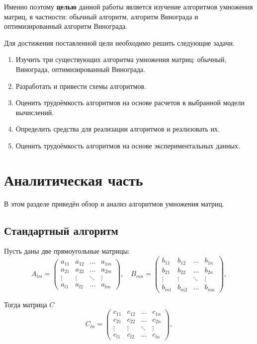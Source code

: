 \documentclass[12pt]{report}
\begin{document}
Именно поэтому \textbf{целью} данной работы является изучение алгоритмов умножения матриц, в частности: обычный алгоритм, алгоритм Винограда и оптимизированный алгоритм Винограда. 

Для достижения поставленной цели необходимо решить следующие задачи.
\begin{enumerate}
	\item Изучить три существующих алгоритма умножения матриц: обычный, Винограда, оптимизированный Винограда.
	\item Разработать и привести схемы алгоритмов.
	\item Оценить трудоёмкость алгоритмов на основе расчетов в выбранной модели вычислений.
	\item Определить средства для реализации алгоритмов и реализовать их.
	\item Оценить трудоёмкость алгоритмов на основе экспериментальных данных.
\end{enumerate}


\chapter{Аналитическая часть}

В этом разделе приведён обзор и анализ алгоритмов умножения матриц.

\section{Стандартный алгоритм}

Пусть даны две прямоугольные матрицы:
\begin{equation}
	A_{lm} = \begin{pmatrix}
		a_{11} & a_{12} & \ldots & a_{1m}\\
		a_{21} & a_{22} & \ldots & a_{2m}\\
		\vdots & \vdots & \ddots & \vdots\\
		a_{l1} & a_{l2} & \ldots & a_{lm}
	\end{pmatrix},
	\quad
	B_{mn} = \begin{pmatrix}
		b_{11} & b_{12} & \ldots & b_{1n}\\
		b_{21} & b_{22} & \ldots & b_{2n}\\
		\vdots & \vdots & \ddots & \vdots\\
		b_{m1} & b_{m2} & \ldots & b_{mn}
	\end{pmatrix},
\end{equation}

Тогда матрица $C$
\begin{equation}
	C_{ln} = \begin{pmatrix}
		c_{11} & c_{12} & \ldots & c_{1n}\\
		c_{21} & c_{22} & \ldots & c_{2n}\\
		\vdots & \vdots & \ddots & \vdots\\
		c_{l1} & c_{l2} & \ldots & c_{ln}
	\end{pmatrix},
\end{equation}
\end{document}
